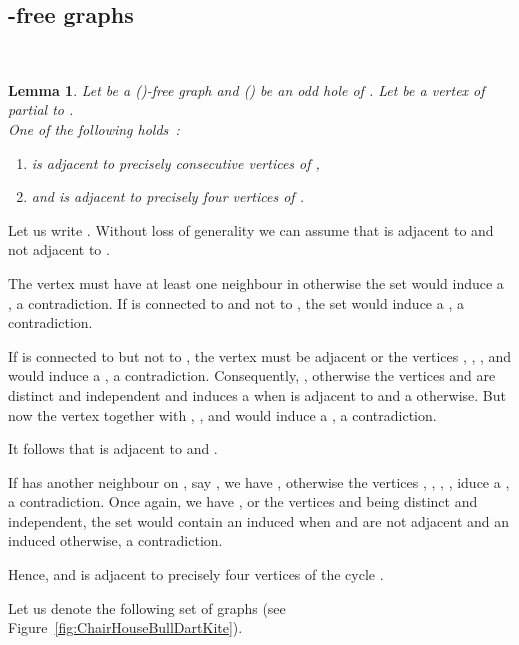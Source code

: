 \documentclass{amsart}
\newtheorem{lem}[thm]{Lemma}
\theoremstyle{definition}
\theoremstyle{remark}
\newenvironment{prf}{{\bf \noindent Proof. } }{\hfill\\}
\begin{document}
\subsection{-free graphs}
\\



\begin{lem}\label{lemma:Chair-bull-free}
Let  be a ()-free graph  and  () be an odd hole of . Let  be a vertex of  partial to .\\
One of the following holds~:
\begin{enumerate}
\item  is adjacent to precisely  consecutive vertices of ,
\item   and  is  adjacent to precisely four vertices of .
\end{enumerate}
\end{lem}
\begin{prf}
Let us write . Without loss of generality we can assume that  is adjacent to  and not adjacent to .

The vertex  must have at least one neighbour in  otherwise the set  would induce a , a contradiction.
If  is connected to  and not to , the set  would induce a , a contradiction.

If  is connected to  but not to , the vertex  must be adjacent  or the vertices , , ,  and  would induce a , a contradiction. 
Consequently, , otherwise the vertices  and  are distinct and independent and  induces a  when  is adjacent to  and a  otherwise. 
But now the vertex  together with , ,  and  would induce a , a contradiction.

It follows that  is adjacent to  and .

If  has another neighbour on , say , we have , otherwise the vertices , , , ,  iduce a , a contradiction. Once again, we have , or the vertices  
 and  being distinct and independent, the set  would contain an induced  when  and  are not adjacent and an induced  otherwise, a contradiction.

Hence,  and  is adjacent to precisely four vertices of the cycle .
\end{prf}


Let us denote  the following set of graphs  (see Figure~\ref{fig:ChairHouseBullDartKite}).
\end{document}
